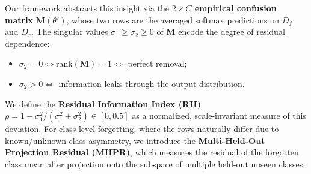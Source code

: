 \documentclass[journal]{IEEEtran}
\theoremstyle{definition}
\begin{document}
Our framework abstracts this insight via the \textbf{$2\times C$ empirical confusion matrix} $\mathbf{M}(\theta')$, whose two rows are the averaged softmax predictions on $D_f$ and $D_r$. The singular values $\sigma_1 \ge \sigma_2 \ge 0$ of $\mathbf{M}$ encode the degree of residual dependence:

\begin{itemize}
\item $\sigma_2 = 0 \iff \mathrm{rank}(\mathbf{M}) = 1 \iff$ perfect removal;
\item $\sigma_2 > 0 \iff$ information leaks through the output distribution.
\end{itemize}

We define the \textbf{Residual Information Index (RII)} $\rho = 1 - \sigma_1^2/(\sigma_1^2+\sigma_2^2) \in [0, 0.5]$ as a normalized, scale-invariant measure of this deviation. For class-level forgetting, where the rows naturally differ due to known/unknown class asymmetry, we introduce the \textbf{Multi-Held-Out Projection Residual (MHPR)}, which measures the residual of the forgotten class mean after projection onto the subspace of multiple held-out unseen classes.
\end{document}
